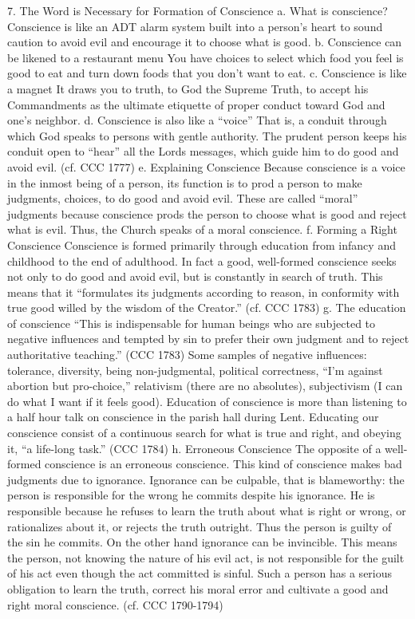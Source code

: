 \documentclass[oneside]{book}
\begin{document}
7. The Word is Necessary for Formation of Conscience
a. What is conscience?
Conscience is like an ADT alarm system built into a person's heart to sound
caution to avoid evil and encourage it to choose what is good.
b. Conscience can be likened to a restaurant menu
You have choices to select which food you feel is good to eat and turn down
foods that you don't want to eat.
c. Conscience is like a magnet
It draws you to truth, to God the Supreme Truth, to accept his Commandments as
the ultimate etiquette of proper conduct toward God and one's neighbor.
d. Conscience is also like a ``voice''
That is, a conduit through which God speaks to persons with gentle
authority. The prudent person keeps his conduit open to ``hear'' all the Lords
messages, which guide him to do good and avoid evil. (cf. CCC 1777)
e. Explaining Conscience
Because conscience is a voice in the inmost being of a person, its function is
to prod a person to make judgments, choices, to do good and avoid evil. These
are called ``moral'' judgments because conscience prods the person to choose
what is good and reject what is evil. Thus, the Church speaks of a moral
conscience.
f. Forming a Right Conscience
Conscience is formed primarily through education from infancy and childhood to
the end of adulthood. In fact a good, well-formed conscience seeks not only to
do good and avoid evil, but is constantly in search of truth. This means that it
``formulates its judgments according to reason, in conformity with true good
willed by the wisdom of the Creator.'' (cf. CCC 1783)
g. The education of conscience
``This is indispensable for human beings who are subjected to negative
influences and tempted by sin to prefer their own judgment and to reject
authoritative teaching.'' (CCC 1783) Some samples of negative influences:
tolerance, diversity, being non-judgmental, political correctness, ``I'm against
abortion but pro-choice,'' relativism (there are no absolutes), subjectivism (I
can do what I want if it feels good).
Education of conscience is more than listening to a half hour talk on conscience
in the parish hall during Lent. Educating our conscience consist of a continuous
search for what is true and right, and obeying it, ``a life-long task.'' (CCC
1784)
h. Erroneous Conscience
The opposite of a well-formed conscience is an erroneous conscience. This kind
of conscience makes bad judgments due to ignorance. Ignorance can be culpable,
that is blameworthy: the person is responsible for the wrong he commits despite
his ignorance. He is responsible because he refuses to learn the truth about
what is right or wrong, or rationalizes about it, or rejects the truth
outright. Thus the person is guilty of the sin he commits. On the other hand
ignorance can be invincible. This means the person, not knowing the nature of
his evil act, is not responsible for the guilt of his act even though the act
committed is sinful. Such a person has a serious obligation to learn the truth,
correct his moral error and cultivate a good and right moral
conscience. (cf. CCC 1790-1794)
\end{document}
